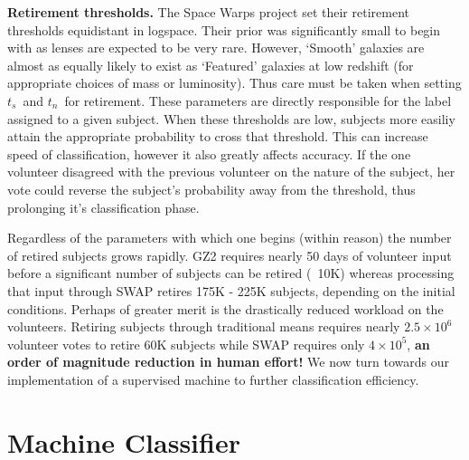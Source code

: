 \documentclass[twocolumn]{aastex6}
\newcommand{\ts}{$t_s$}
\newcommand{\tn}{$t_n$}
\begin{document}
\textbf{Retirement thresholds.}
The Space Warps project set their retirement thresholds equidistant in logspace. 
Their prior was significantly small to begin with as lenses are expected to be very rare.
However, `Smooth' galaxies are almost as equally likely to exist 
as `Featured' galaxies at low redshift (for appropriate choices of mass or luminosity). 
Thus care must be taken when setting \ts~and \tn~for retirement. 
These parameters are directly responsible for the label assigned to a given subject. 
When these thresholds are low, subjects more easiliy attain the appropriate 
probability to cross that threshold. This can increase speed of classification, however
it also greatly affects accuracy. If the one volunteer disagreed with the previous 
volunteer on the nature of the subject, her vote could reverse the subject's probability
away from the threshold, thus prolonging it's classification phase.  

Regardless of the parameters with which one begins (within reason) the number of 
retired subjects grows rapidly. GZ2 requires nearly 50 days of volunteer input before 
a significant number of subjects can be retired (~10K) whereas processing that input
through SWAP retires 175K - 225K subjects, depending on the initial conditions. 
Perhaps of greater merit is the drastically reduced workload on the volunteers. 
Retiring subjects through traditional means requires nearly $2.5\times10^6$ 
volunteer votes to retire 60K subjects while SWAP requires only $4\times10^5$, 
\textbf{an order of magnitude reduction in human effort!} We now turn towards
our implementation of a supervised machine to further classification efficiency. 


\section{Machine Classifier} \label{sec:machine}
\end{document}
